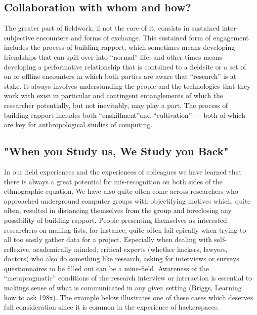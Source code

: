 \documentclass[10pt,letter,oneside]{scrartcl}
\begin{document}
\subsection{Collaboration with whom and how?}

 The greater part of fieldwork, if not the core of it, consists in
 sustained inter-subjective encounters and forms of exchange.  This
 sustained form of engagement includes the process of building
 rapport, which sometimes means developing friendships that can spill
 over into ``normal'' life, and other times means developing a
 performative relationship that is contained to a fieldsite or a set
 of on or offline encounters in which both parties are aware that
 ``research'' is at stake. It always involves understanding the people
 and the technologies that they work with exist in particular and
 contingent entanglements of which the researcher potentially, but not
 inevitably, may play a part. The process of building rapport includes
 both ``enskillment''and ``cultivation'' --- both of which are key for
 anthropological studies of computing.   



\subsection{"When you Study us, We Study you Back" } 

In our field experiences and the experiences of colleagues we have
learned that there is always a great potential for mis-recognition on
both sides of the ethnographic equation. We have also quite often come
across researchers who approached underground computer groups with
objectifying motives which, quite often, resulted in distancing
themselves from the group and foreclosing any possibility of building
rapport. People presenting themselves as interested researchers on
mailing-lists, for instance, quite often fail epically when trying to
all too easily gather data for a project.  Especially when dealing
with self-reflexive, academically minded, critical experts (whether
hackers, lawyers, doctors) who also do something like research, asking
for interviews or surveys questionnaires to be filled out can be a
mine-field.  Awareness of the ``metapragmatic'' conditions of the
research interview or interaction is essential to makings sense of
what is communicated in any given setting (Briggs, Learning how to ask
198x).  The example below illustrates one of these cases which
deserves full consideration since it is common in the experience of
hackerspaces.
\end{document}
